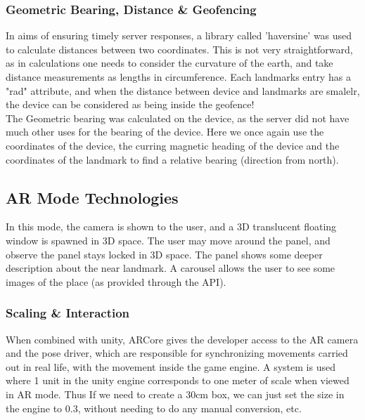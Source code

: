 \subsubsection{Geometric Bearing, Distance \& Geofencing}
In aims of ensuring timely server responses, a library called 'haversine' was used to calculate distances between two coordinates. This is not very straightforward, 
as in calculations one needs to consider the curvature of the earth, and take distance measurements as lengths in circumference. Each landmarks entry has a "rad" 
attribute, and when the distance between device and landmarks are smalelr, the device can be considered as being inside the geofence!\\
The Geometric bearing was calculated on the device, as the server did not have much other uses for the bearing of the device. Here we once again use the coordinates 
of the device, the curring magnetic heading of the device and the coordinates of the landmark to find a relative bearing (direction from north).   




\subsection{AR Mode Technologies}
In this mode, the camera is shown to the user, and a 3D translucent floating window is spawned in 3D space.
The user may move around the panel, and observe the panel stays locked in 3D space. The panel shows
some deeper description about the near landmark. A carousel allows the user to see some images of the place
 (as provided through the API). 


\subsubsection{Scaling \& Interaction}
When combined with unity, ARCore gives the developer access to the AR camera and the pose driver, which are responsible for synchronizing movements 
carried out in real life, with the movement inside the game engine. A system is used where 1 unit in the unity engine corresponds to one meter of scale when 
viewed in AR mode. Thus If we need to create a 30cm box, we can just set the size in the engine to 0.3, without needing to do any manual conversion, etc.\\

